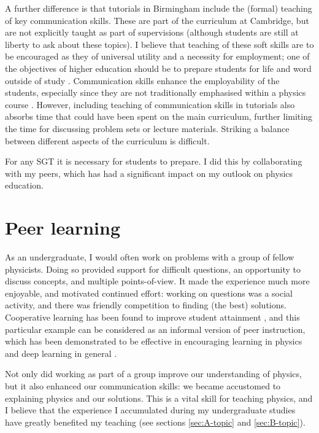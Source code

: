 A further difference is that tutorials in Birmingham include the (formal) teaching of key communication skills. These are part of the curriculum at Cambridge, but are not explicitly taught as part of supervisions (although students are still at liberty to ask about these topics). I believe that teaching of these soft skills are to be encouraged as they of universal utility and a necessity for employment; one of the objectives of higher education should be to prepare students for life and word outside of study \citep{Fallows2000,Harvey2000}. Communication skills enhance the employability of the students, especially since they are not traditionally emphasised within a physics course \citep[cf.][]{Sharma2007}. However, including teaching of communication skills in tutorials also absorbs time that could have been spent on the main curriculum, further limiting the time for discussing problem sets or lecture materials. Striking a balance between different aspects of the curriculum is difficult.

For any SGT it is necessary for students to prepare. I did this by collaborating with my peers, which has had a significant impact on my outlook on physics education.

\section{Peer learning}\label{sec:peer}

As an undergraduate, I would often work on problems with a group of fellow physicists. Doing so provided support for difficult questions, an opportunity to discuss concepts, and multiple points-of-view. It made the experience much more enjoyable, and motivated continued effort: working on questions was a social activity, and there was friendly competition to finding (the best) solutions. Cooperative learning has been found to improve student attainment \citep{Qin1995,Cabrera2002}, and this particular example can be considered as an informal version of peer instruction, which has been demonstrated to be effective in encouraging learning in physics \citep{Crouch2001,Pilzer2001,Miller2006} and deep learning in general \citep{Marton1976,Wilson2010}.

Not only did working as part of a group improve our understanding of physics, but it also enhanced our communication skills: we became accustomed to explaining physics and our solutions. This is a vital skill for teaching physics, and I believe that the experience I accumulated during my undergraduate studies have greatly benefited my teaching (see sections \ref{sec:A-topic} and \ref{sec:B-topic}).

